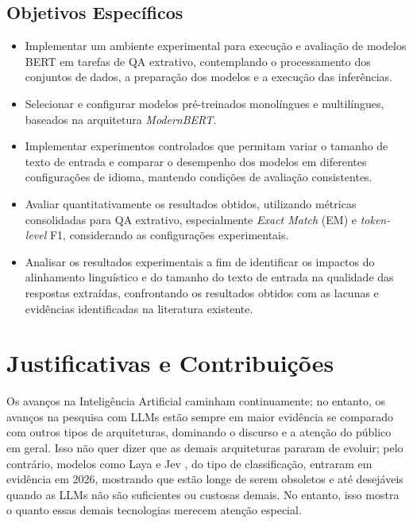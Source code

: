 \documentclass[12pt,a4paper]{article}
\begin{document}
\subsection{Objetivos Específicos}

\begin{itemize}
    \item Implementar um ambiente experimental para execução e avaliação de modelos BERT em tarefas de QA extrativo, contemplando o processamento dos conjuntos de dados, a preparação dos modelos e a execução das inferências.
    \item Selecionar e configurar modelos pré-treinados monolíngues e multilíngues, baseados na arquitetura \textit{ModernBERT.}
    \item Implementar experimentos controlados que permitam variar o tamanho de texto de entrada e comparar o desempenho dos modelos em diferentes configurações de idioma, mantendo condições de avaliação consistentes.
    \item Avaliar quantitativamente os resultados obtidos, utilizando métricas consolidadas para QA extrativo, especialmente \textit{Exact Match} (EM) e \textit{token-level} F1, considerando as configurações experimentais.
    \item Analisar os resultados experimentais a fim de identificar os impactos do alinhamento linguístico e do tamanho do texto de entrada na qualidade das respostas extraídas, confrontando os resultados obtidos com as lacunas e evidências identificadas na literatura existente.
\end{itemize}

\section{Justificativas e Contribuições}

Os avanços na Inteligência Artificial caminham continuamente; no entanto, os avanços na pesquisa com LLMs estão sempre em maior evidência se comparado com outros tipos de arquiteturas, dominando o discurso e a atenção do público em geral. Isso não quer dizer que as demais arquiteturas pararam de evoluir; pelo contrário, modelos como Laya \cite{laya} e Jev \cite{jev}, do tipo de classificação, entraram em evidência em 2026, mostrando que estão longe de serem obsoletos e até desejáveis quando as LLMs não são suficientes ou custosas demais. No entanto, isso mostra o quanto essas demais tecnologias merecem atenção especial.
\end{document}
